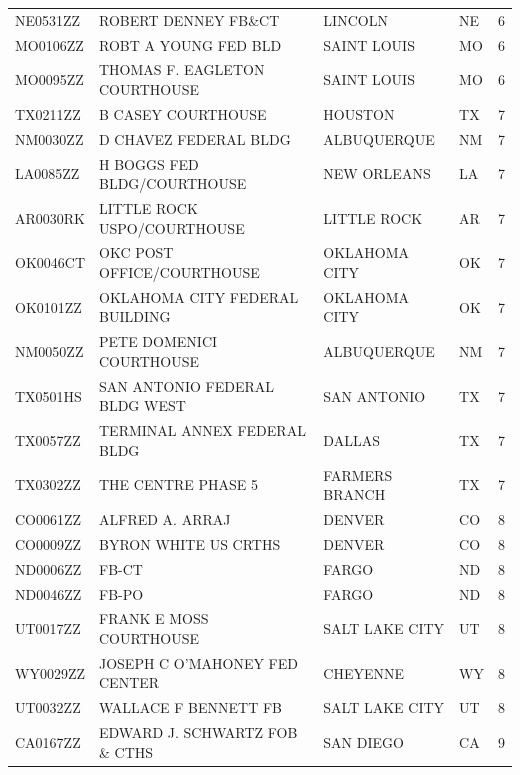 \documentclass[12pt]{article}
\begin{document}
{\begin{longtable}{lllll}
NE0531ZZ         & ROBERT DENNEY FB\&CT            & LINCOLN        & NE    & 6      \\
MO0106ZZ         & ROBT A YOUNG FED BLD            & SAINT LOUIS    & MO    & 6      \\
MO0095ZZ         & THOMAS F. EAGLETON COURTHOUSE   & SAINT LOUIS    & MO    & 6      \\
TX0211ZZ         & B CASEY COURTHOUSE              & HOUSTON        & TX    & 7      \\
NM0030ZZ         & D CHAVEZ FEDERAL BLDG           & ALBUQUERQUE    & NM    & 7      \\
LA0085ZZ         & H BOGGS FED BLDG/COURTHOUSE     & NEW ORLEANS    & LA    & 7      \\
AR0030RK         & LITTLE ROCK USPO/COURTHOUSE     & LITTLE ROCK    & AR    & 7      \\
OK0046CT         & OKC POST OFFICE/COURTHOUSE      & OKLAHOMA CITY  & OK    & 7      \\
OK0101ZZ         & OKLAHOMA CITY FEDERAL BUILDING  & OKLAHOMA CITY  & OK    & 7      \\
NM0050ZZ         & PETE DOMENICI COURTHOUSE        & ALBUQUERQUE    & NM    & 7      \\
TX0501HS         & SAN ANTONIO FEDERAL BLDG WEST   & SAN ANTONIO    & TX    & 7      \\
TX0057ZZ         & TERMINAL ANNEX FEDERAL BLDG     & DALLAS         & TX    & 7      \\
TX0302ZZ         & THE CENTRE PHASE 5              & FARMERS BRANCH & TX    & 7      \\
CO0061ZZ         & ALFRED A. ARRAJ                 & DENVER         & CO    & 8      \\
CO0009ZZ         & BYRON WHITE US CRTHS            & DENVER         & CO    & 8      \\
ND0006ZZ         & FB-CT                           & FARGO          & ND    & 8      \\
ND0046ZZ         & FB-PO                           & FARGO          & ND    & 8      \\
UT0017ZZ         & FRANK E MOSS COURTHOUSE         & SALT LAKE CITY & UT    & 8      \\
WY0029ZZ         & JOSEPH C O'MAHONEY FED CENTER   & CHEYENNE       & WY    & 8      \\
UT0032ZZ         & WALLACE F BENNETT FB            & SALT LAKE CITY & UT    & 8      \\
CA0167ZZ         & EDWARD J. SCHWARTZ FOB \& CTHS  & SAN DIEGO      & CA    & 9      \\

\end{longtable}}
\end{document}

